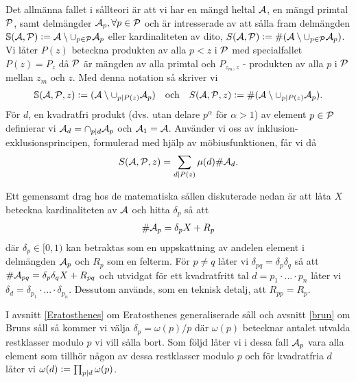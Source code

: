 Det allmänna fallet i sållteori är att vi har en mängd heltal \(\A\), en mängd primtal \(\P\), samt delmängder \(\A_p, \forall p \in \P\) och är intresserade av att sålla fram delmängden \(\mathbb{S}(\A, \P) := \A \setminus \cup_{p \in \P} \A_p\) eller kardinaliteten av dito, \(S(\A, \P) :=\card{(\A \setminus \cup_{p \in \P} \A_p)}\). Vi låter \(P(z)\) beteckna produkten av alla \(p < z\) i \(\P\) med specialfallet \(P(z) = P_z\) då \(\P\) är mängden av alla primtal och \(P_{z_m, z}\) - produkten av alla \(p\) i \(\P\) mellan \(z_m\) och \(z\). Med denna notation så skriver vi %
\begin{align*}
    \mathbb{S}(\A, \P, z) := (\A \setminus \cup_{p \divides P(z)} \A_p)
    \quad \text{och} \quad
    \S{A}{P}{z} := \card{(\A \setminus \cup_{p \divides P(z)} \A_p)} .
\end{align*}
För \(d\), en kvadratfri produkt (dvs. utan delare \(p^\alpha\) för \(\alpha > 1\)) av element \(p \in \P\) definierar vi \(\A_d = \cap_{p \divides d} \A_p\) och \(\A_1 = \A\). Använder vi oss av inklusion-exklusionsprincipen, formulerad med hjälp av möbiusfunktionen, får vi då
\begin{align} \label{inclusionexclusion}
    \S{A}{P}{z} = \sum_{d \divides P(z)} \mu(d) \card{\A_d} .
\end{align} %

Ett gemensamt drag hos de matematiska sållen diskuterade nedan är att låta \(X\) beteckna kardinaliteten av \(\A\) och hitta \(\delta_p\) så att
\begin{align} \label{deltaX}
    \card{\A_p} = \delta_p X + R_p
\end{align}
där \(\delta_p \in [0, 1)\) kan betraktas som en uppskattning av andelen element i delmängden \(\A_p\) och \(R_p\) som en felterm. För \(p \neq q\) låter vi \(\delta_{pq} = \delta_p \delta_q\) så att \(\card{\A_{pq}} = \delta_p \delta_q X + R_{pq}\) och utvidgat för ett kvadratfritt tal \(d = p_1 \cdot ... \cdot p_n\) låter vi \(\delta_{d} = \delta_{p_1} \cdot ... \cdot \delta_{p_n}\). Dessutom används, som en teknisk detalj, att \(R_{pp} = R_p\). 

I avsnitt \ref{Eratosthenes} om Eratosthenes generaliserade såll och avsnitt \ref{brun} om Bruns såll så kommer vi välja \(\delta_p = \omega(p) / p\) där \(\omega(p)\) betecknar antalet utvalda restklasser modulo \(p\) vi vill sålla bort. Som följd låter vi i dessa fall \(\A_p\) vara alla element som tillhör någon av dessa restklasser modulo $p$ och för kvadratfria $d$ låter vi \(\omega(d) := \prod_{p \divides d} \omega(p)\). %
